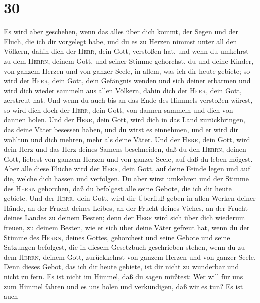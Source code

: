 \hypertarget{section-29}{%
\section{30}\label{section-29}}

 Es wird aber geschehen, wenn das alles über dich kommt,
der Segen und der Fluch, die ich dir vorgelegt habe, und du es zu Herzen
nimmst unter all den Völkern, dahin dich der \textsc{Herr}, dein Gott,
verstoßen hat,  und wenn du umkehrst zu dem
\textsc{Herrn}, deinem Gott, und seiner Stimme gehorchst, du und deine
Kinder, von ganzem Herzen und von ganzer Seele, in allem, was ich dir
heute gebiete;  so wird der \textsc{Herr}, dein Gott, dein
Gefängnis wenden und sich deiner erbarmen und wird dich wieder sammeln
aus allen Völkern, dahin dich der \textsc{Herr}, dein Gott, zerstreut
hat.  Und wenn du auch bis an das Ende des Himmels
verstoßen wärest, so wird dich doch der \textsc{Herr}, dein Gott, von
dannen sammeln und dich von dannen holen.  Und der
\textsc{Herr}, dein Gott, wird dich in das Land zurückbringen, das deine
Väter besessen haben, und du wirst es einnehmen, und er wird dir wohltun
und dich mehren, mehr als deine Väter.  Und der
\textsc{Herr}, dein Gott, wird dein Herz und das Herz deines Samens
beschneiden, daß du den \textsc{Herrn}, deinen Gott, liebest von ganzem
Herzen und von ganzer Seele, auf daß du leben mögest. 
Aber alle diese Flüche wird der \textsc{Herr}, dein Gott, auf deine
Feinde legen und auf die, welche dich hassen und verfolgen.
 Du aber wirst umkehren und der Stimme des \textsc{Herrn}
gehorchen, daß du befolgest alle seine Gebote, die ich dir heute
gebiete.  Und der \textsc{Herr}, dein Gott, wird dir
Überfluß geben in allen Werken deiner Hände, an der Frucht deines
Leibes, an der Frucht deines Viehes, an der Frucht deines Landes zu
deinem Besten; denn der \textsc{Herr} wird sich über dich wiederum
freuen, zu deinem Besten, wie er sich über deine Väter gefreut hat,
 wenn du der Stimme des \textsc{Herrn}, deines Gottes,
gehorchest und seine Gebote und seine Satzungen befolgest, die in diesem
Gesetzbuch geschrieben stehen, wenn du zu dem \textsc{Herrn}, deinem
Gott, zurückkehrst von ganzem Herzen und von ganzer Seele.
 Denn dieses Gebot, das ich dir heute gebiete, ist dir
nicht zu wunderbar und nicht zu fern.  Es ist nicht im
Himmel, daß du sagen müßtest: Wer will für uns zum Himmel fahren und es
uns holen und verkündigen, daß wir es tun?  Es ist auch
